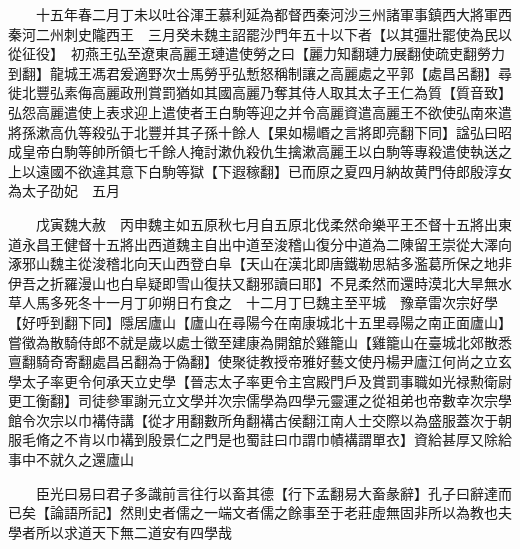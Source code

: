 　　十五年春二月丁未以吐谷渾王慕利延為都督西秦河沙三州諸軍事鎮西大將軍西秦河二州刺史隴西王　三月癸未魏主詔罷沙門年五十以下者【以其彊壯罷使為民以從征役】　初燕王弘至遼東高麗王璉遣使勞之曰【麗力知翻璉力展翻使疏吏翻勞力到翻】龍城王馮君爰適野次士馬勞乎弘慙怒稱制讓之高麗處之平郭【處昌呂翻】尋徙北豐弘素侮高麗政刑賞罰猶如其國高麗乃奪其侍人取其太子王仁為質【質音致】弘怨高麗遣使上表求迎上遣使者王白駒等迎之并令高麗資遣高麗王不欲使弘南來遣將孫漱高仇等殺弘于北豐并其子孫十餘人【果如楊㟭之言將即亮翻下同】諡弘曰昭成皇帝白駒等帥所領七千餘人掩討漱仇殺仇生擒漱高麗王以白駒等專殺遣使執送之上以遠國不欲違其意下白駒等獄【下遐稼翻】已而原之夏四月納故黄門侍郎殷淳女為太子劭妃　五月

　　戊寅魏大赦　丙申魏主如五原秋七月自五原北伐柔然命樂平王丕督十五將出東道永昌王健督十五將出西道魏主自出中道至浚稽山復分中道為二陳留王崇從大澤向涿邪山魏主從浚稽北向天山西登白阜【天山在漢北即唐鐵勒思結多濫葛所保之地非伊吾之折羅漫山也白阜疑即雪山復扶又翻邪讀曰耶】不見柔然而還時漠北大旱無水草人馬多死冬十一月丁卯朔日冇食之　十二月丁巳魏主至平城　豫章雷次宗好學【好呼到翻下同】隱居廬山【廬山在尋陽今在南康城北十五里尋陽之南正面廬山】嘗徵為散騎侍郎不就是歲以處士徵至建康為開舘於雞籠山【雞籠山在臺城北郊散悉亶翻騎奇寄翻處昌呂翻為于偽翻】使聚徒教授帝雅好藝文使丹楊尹廬江何尚之立玄學太子率更令何承天立史學【晉志太子率更令主宫殿門戶及賞罰事職如光禄勲衛尉更工衡翻】司徒參軍謝元立文學并次宗儒學為四學元靈運之從祖弟也帝數幸次宗學館令次宗以巾褠侍講【從才用翻數所角翻褠古侯翻江南人士交際以為盛服蓋次于朝服毛脩之不肯以巾褠到殷景仁之門是也蜀註曰巾謂巾幘褠謂單衣】資給甚厚又除給事中不就久之還廬山

　　臣光曰易曰君子多識前言往行以畜其德【行下孟翻易大畜彖辭】孔子曰辭達而已矣【論語所記】然則史者儒之一端文者儒之餘事至于老莊虛無固非所以為教也夫學者所以求道天下無二道安有四學哉

